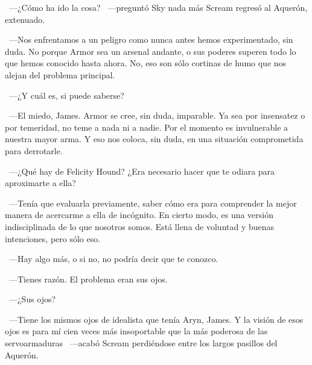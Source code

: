 \parbreak
~---¿Cómo ha ido la cosa? ~---preguntó Sky nada más Scream regresó al Aquerón, extenuado.

~---Nos enfrentamos a un peligro como nunca antes hemos experimentado, sin duda. No porque Armor sea un arsenal andante, o sus poderes superen todo lo que hemos conocido hasta ahora. No, eso son sólo cortinas de humo que nos alejan del problema principal.

~---¿Y cuál es, si puede saberse?

~---El miedo, James. Armor se cree, sin duda, imparable. Ya sea por insensatez o por temeridad, no teme a nada ni a nadie. Por el momento es invulnerable a nuestra mayor arma. Y eso nos coloca, sin duda, en una situación comprometida para derrotarle.

~---¿Qué hay de Felicity Hound? ¿Era necesario hacer que te odiara para aproximarte a ella?

~---Tenía que evaluarla previamente, saber cómo era para comprender la mejor manera de acercarme a ella de incógnito. En cierto modo, es una versión indisciplinada de lo que nosotros somos. Está llena de voluntad y buenas intenciones, pero sólo eso.

~---Hay algo más, o si no, no podría decir que te conozco.

~---Tienes razón. El problema eran sus ojos.

~---¿Sus ojos?

~---Tiene los mismos ojos de idealista que tenía Aryn, James. Y la visión de esos ojos es para mí cien veces más insoportable que la más poderosa de las servoarmaduras ~---acabó Scream perdiéndose entre los largos pasillos del Aquerón.

\endinput
